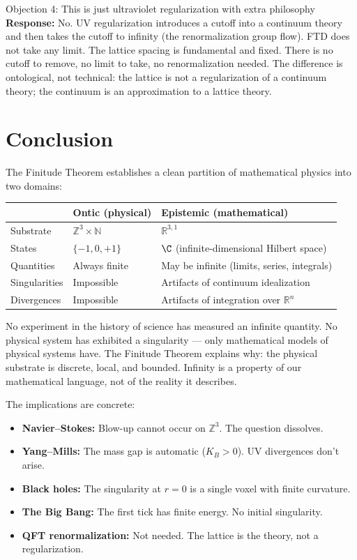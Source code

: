 \documentclass[11pt]{article}
\theoremstyle{tight}
\theoremstyle{plainroman}
\newcommand{\R}{\mathbb{R}}
\newcommand{\Z}{\mathbb{Z}}
\newcommand{\N}{\mathbb{N}}
\begin{document}
\begin{statusbox}{Objection 4: This is just ultraviolet regularization with extra philosophy}
\textbf{Response:} No.
UV regularization introduces a cutoff into a continuum theory and then takes the cutoff to infinity (the renormalization group flow).
FTD does not take any limit.
The lattice spacing is fundamental and fixed.
There is no cutoff to remove, no limit to take, no renormalization needed.
The difference is ontological, not technical: the lattice is not a regularization of a continuum theory; the continuum is an approximation to a lattice theory.
\end{statusbox}

\section{Conclusion}

The Finitude Theorem establishes a clean partition of mathematical physics into two domains:

\begin{center}
\renewcommand{\arraystretch}{1.25}
\begin{tabular}{lll}
\toprule
& \textbf{Ontic (physical)} & \textbf{Epistemic (mathematical)} \\
\midrule
Substrate & $\Z^3\times\N$ & $\R^{3,1}$ \\
States & $\{-1,0,+1\}$ & $\C$ (infinite-dimensional Hilbert space) \\
Quantities & Always finite & May be infinite (limits, series, integrals) \\
Singularities & Impossible & Artifacts of continuum idealization \\
Divergences & Impossible & Artifacts of integration over $\R^n$ \\
\bottomrule
\end{tabular}
\end{center}

No experiment in the history of science has measured an infinite quantity.
No physical system has exhibited a singularity --- only mathematical models of physical systems have.
The Finitude Theorem explains why: the physical substrate is discrete, local, and bounded.
Infinity is a property of our mathematical language, not of the reality it describes.

The implications are concrete:
\begin{itemize}[nosep]
\item \textbf{Navier--Stokes:} Blow-up cannot occur on $\Z^3$. The question dissolves.
\item \textbf{Yang--Mills:} The mass gap is automatic ($K_B>0$). UV divergences don't arise.
\item \textbf{Black holes:} The singularity at $r=0$ is a single voxel with finite curvature.
\item \textbf{The Big Bang:} The first tick has finite energy. No initial singularity.
\item \textbf{QFT renormalization:} Not needed. The lattice is the theory, not a regularization.
\end{itemize}
\end{document}
